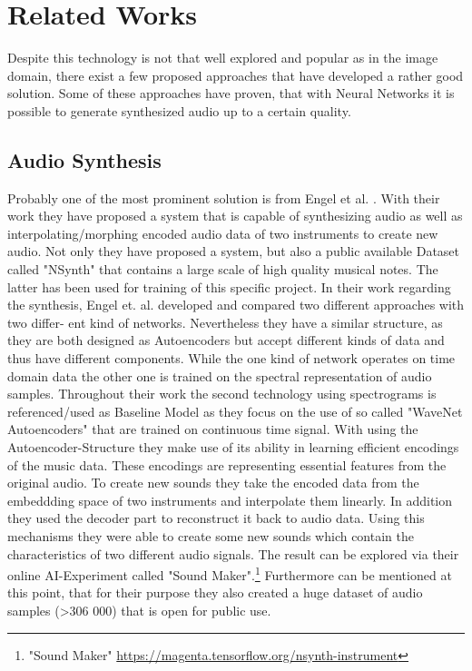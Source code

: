 \chapter{Related Works}

Despite this technology is not that well explored and popular as in the image domain, there exist a few proposed approaches that have developed a rather good solution. Some of these approaches have proven, that with Neural Networks it is possible to generate synthesized audio up to a certain quality.

\section{Audio Synthesis}
Probably one of the most prominent solution is from Engel et al. \cite{Engel2017}. With their work they have proposed a system that is capable of synthesizing audio as well as interpolating/morphing encoded audio data of two instruments to create new audio. Not only they have proposed a system, but also a public available Dataset called "NSynth" that contains a large scale of high quality musical notes. The latter has been used for training of this specific project. In their work regarding the synthesis, Engel et. al. developed and compared two different approaches with two differ- ent kind of networks. Nevertheless they have a similar structure, as they are both designed as Autoencoders but accept different kinds of data and thus have different components. While the one kind of network operates on time domain data the other one is trained on the spectral representation of audio samples. Throughout their work the second technology using spectrograms is referenced/used as Baseline Model as they focus on the use of so called "WaveNet Autoencoders" that are trained on continuous time signal. With using the Autoencoder-Structure they make use of its ability in learning efficient encodings of the music data. These encodings are representing essential features from the original audio. To create new sounds they take the encoded data from the embeddding space of two instruments and interpolate them linearly. In addition they used the decoder part to reconstruct it back to audio data. Using this mechanisms they were able to create some new sounds which contain the characteristics of two different audio signals. The result can be explored via their online AI-Experiment called "Sound Maker".\footnote{"Sound Maker" \url{https://magenta.tensorflow.org/nsynth-instrument}} Furthermore can be mentioned at this point, that for their purpose they also created a huge dataset of audio samples (>306 000) that is open for public use.\\

